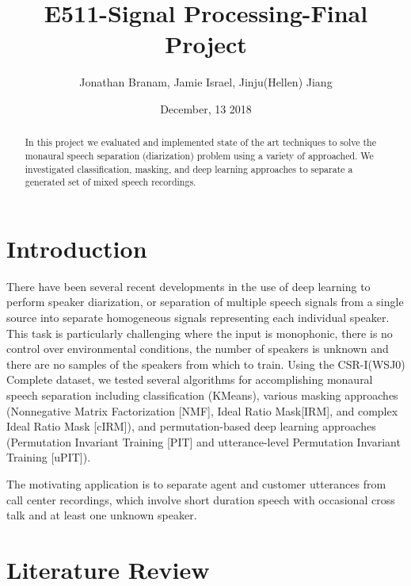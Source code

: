 \documentclass[journal, a4paper]{IEEEtran}
\begin{document}
	\title{E511-Signal Processing-Final Project}
	\author{Jonathan Branam, Jamie Israel, Jinju(Hellen) Jiang}
	\date{December, 13 2018}
	\maketitle
%
\begin{abstract}
In this project we evaluated and implemented state of the art techniques to solve the monaural speech separation (diarization) problem using a variety of approached. We investigated classification, masking, and deep learning approaches to separate a generated set of mixed speech recordings.
\end{abstract}

\section{Introduction}
There have been several recent developments in the use of deep learning to perform speaker diarization, or separation of multiple speech signals from a single source into separate homogeneous signals representing each individual speaker. This task is particularly challenging where the input is monophonic, there is no control over environmental conditions, the number of speakers is unknown and there are no samples of the speakers from which to train. Using the CSR-I(WSJ0) Complete dataset\cite{garofolo:wsj0}, we tested several algorithms for accomplishing monaural speech separation including classification (KMeans), various masking approaches (Nonnegative Matrix Factorization [NMF], Ideal Ratio Mask[IRM], and complex Ideal Ratio Mask [cIRM]), and permutation-based deep learning approaches (Permutation Invariant Training [PIT] and utterance-level Permutation Invariant Training [uPIT]).

The motivating application is to separate agent and customer utterances from call center recordings, which involve short duration speech with occasional cross talk and at least one unknown speaker.

\section{Literature Review}
\end{document}
